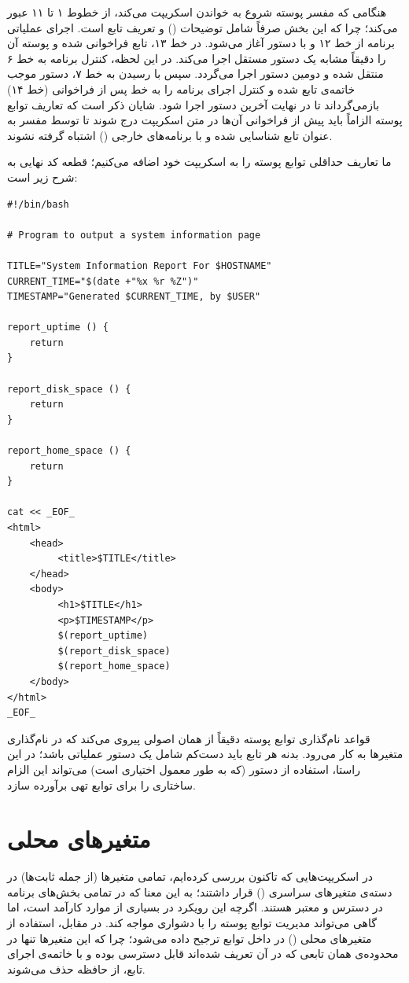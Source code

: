 هنگامی که مفسر پوسته شروع به خواندن اسکریپت می‌کند، از خطوط ۱ تا ۱۱ عبور می‌کند؛ چرا که این بخش صرفاً شامل توضیحات () و تعریف تابع است. اجرای عملیاتی برنامه از خط ۱۲ و با دستور  آغاز می‌شود. در خط ۱۳، تابع  فراخوانی شده و پوسته آن را دقیقاً مشابه یک دستور مستقل اجرا می‌کند. در این لحظه، کنترل برنامه به خط ۶ منتقل شده و دومین دستور  اجرا می‌گردد. سپس با رسیدن به خط ۷، دستور  موجب خاتمه‌ی تابع شده و کنترل اجرای برنامه را به خط پس از فراخوانی (خط ۱۴) بازمی‌گرداند تا در نهایت آخرین دستور  اجرا شود. شایان ذکر است که تعاریف توابع پوسته الزاماً باید پیش از فراخوانی آن‌ها در متن اسکریپت درج شوند تا توسط مفسر به عنوان تابع شناسایی شده و با برنامه‌های خارجی () اشتباه گرفته نشوند.

ما تعاریف حداقلی توابع پوسته را به اسکریپت خود اضافه می‌کنیم؛ قطعه کد نهایی به شرح زیر است:

\begin{latin}
\begin{lstlisting}
#!/bin/bash

# Program to output a system information page

TITLE="System Information Report For $HOSTNAME"
CURRENT_TIME="$(date +"%x %r %Z")"
TIMESTAMP="Generated $CURRENT_TIME, by $USER"

report_uptime () {
    return
}

report_disk_space () {
    return
}

report_home_space () {
    return
}

cat << _EOF_
<html>
    <head>
         <title>$TITLE</title>
    </head>
    <body>
         <h1>$TITLE</h1>
         <p>$TIMESTAMP</p>
         $(report_uptime)
         $(report_disk_space)
         $(report_home_space)
    </body>
</html>
_EOF_
\end{lstlisting}
\end{latin}

قواعد نام‌گذاری توابع پوسته دقیقاً از همان اصولی پیروی می‌کند که در نام‌گذاری متغیرها به کار می‌رود. بدنه هر تابع باید دست‌کم شامل یک دستور عملیاتی باشد؛ در این راستا، استفاده از دستور  (که به طور معمول اختیاری است) می‌تواند این الزام ساختاری را برای توابع تهی برآورده سازد.

\section{متغیرهای محلی}

در اسکریپت‌هایی که تاکنون بررسی کرده‌ایم، تمامی متغیرها (از جمله ثابت‌ها) در دسته‌ی متغیرهای سراسری () قرار داشتند؛ به این معنا که در تمامی بخش‌های برنامه در دسترس و معتبر هستند. اگرچه این رویکرد در بسیاری از موارد کارآمد است، اما گاهی می‌تواند مدیریت توابع پوسته را با دشواری مواجه کند. در مقابل، استفاده از متغیرهای محلی () در داخل توابع ترجیح داده می‌شود؛ چرا که این متغیرها تنها در محدوده‌ی همان تابعی که در آن تعریف شده‌اند قابل دسترسی بوده و با خاتمه‌ی اجرای تابع، از حافظه حذف می‌شوند.

